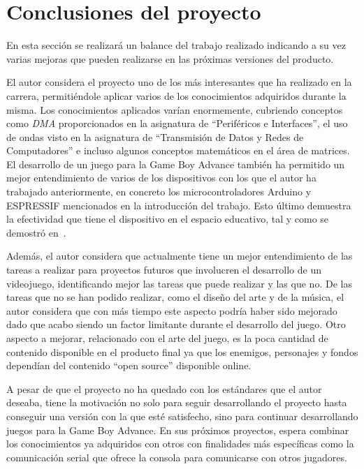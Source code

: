 \chapter{Conclusiones del proyecto}\label{sec:conclusion}
En esta sección se realizará un balance del trabajo realizado indicando a su vez varias mejoras que pueden realizarse en las próximas versiones del producto.

El autor considera el proyecto uno de los más interesantes que ha realizado en la carrera, permitiéndole aplicar varios de los conocimientos adquiridos durante la misma. Los conocimientos aplicados varían enormemente, cubriendo conceptos como \textit{DMA} proporcionados en la asignatura de ``Periféricos e Interfaces'', el uso de ondas visto en la asignatura de ``Transmisión de Datos y Redes de Computadores'' e incluso algunos conceptos matemáticos en el área de matrices. El desarrollo de un juego para la Game Boy Advance también ha permitido un mejor entendimiento de varios de los dispositivos con los que el autor ha trabajado anteriormente, en concreto los microcontroladores Arduino y ESPRESSIF mencionados en la introducción del trabajo. Esto último demuestra la efectividad que tiene el dispositivo en el espacio educativo, tal y como se demostró en~\cite{bib:paper3,bib:paper_1,bib:paper_2}.

Además, el autor considera que actualmente tiene un mejor entendimiento de las tareas a realizar para proyectos futuros que involucren el desarrollo de un videojuego, identificando mejor las tareas que puede realizar y las que no. De las tareas que no se han podido realizar, como el diseño del arte y de la música, el autor considera que con más tiempo este aspecto podría haber sido mejorado dado que acabo siendo un factor limitante durante el desarrollo del juego. Otro aspecto a mejorar, relacionado con el arte del juego, es la poca cantidad de contenido disponible en el producto final ya que los enemigos, personajes y fondos dependían del contenido ``open source'' disponible online. 

A pesar de que el proyecto no ha quedado con los estándares que el autor deseaba, tiene la motivación no solo para seguir desarrollando el proyecto hasta conseguir una versión con la que esté satisfecho, sino para continuar desarrollando juegos para la Game Boy Advance. En sus próximos proyectos, espera combinar los conocimientos ya adquiridos con otros con finalidades más específicas como la comunicación serial que ofrece la consola para comunicarse con otros jugadores.

